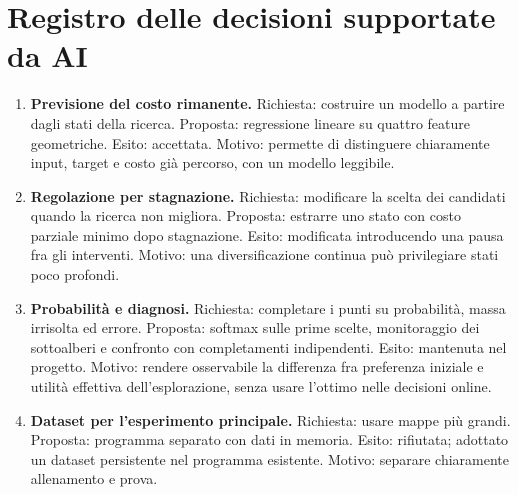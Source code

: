 \section*{Registro delle decisioni supportate da AI}

\begin{enumerate}
\item \textbf{Previsione del costo rimanente.}
Richiesta: costruire un modello a partire dagli stati della ricerca.
Proposta: regressione lineare su quattro feature geometriche.
Esito: accettata. Motivo: permette di distinguere chiaramente input,
target e costo già percorso, con un modello leggibile.

\item \textbf{Regolazione per stagnazione.}
Richiesta: modificare la scelta dei candidati quando la ricerca non migliora.
Proposta: estrarre uno stato con costo parziale minimo dopo stagnazione.
Esito: modificata introducendo una pausa fra gli interventi.
Motivo: una diversificazione continua può privilegiare stati poco profondi.

\item \textbf{Probabilità e diagnosi.}
Richiesta: completare i punti su probabilità, massa irrisolta ed errore.
Proposta: softmax sulle prime scelte, monitoraggio dei sottoalberi e
confronto con completamenti indipendenti. Esito: mantenuta nel progetto.
Motivo: rendere osservabile la differenza fra preferenza iniziale e
utilità effettiva dell'esplorazione, senza usare l'ottimo nelle decisioni online.

\item \textbf{Dataset per l'esperimento principale.}
Richiesta: usare mappe più grandi. Proposta: programma separato con dati
in memoria. Esito: rifiutata; adottato un dataset persistente nel programma
esistente. Motivo: separare chiaramente allenamento e prova.

\end{enumerate}
